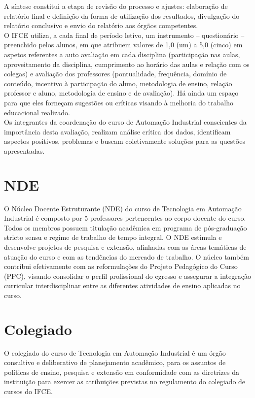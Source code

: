 A síntese constitui a etapa de revisão do processo e ajustes: elaboração de relatório final e definição da forma de utilização dos resultados, divulgação do relatório conclusivo e envio do relatório aos órgãos competentes.\\

O IFCE utiliza, a cada final de período letivo, um instrumento – questionário – preenchido pelos alunos, em que atribuem valores de 1,0 (um) a 5,0 (cinco) em aspetos referentes a auto avaliação em cada disciplina (participação nas aulas, aproveitamento da disciplina, cumprimento ao horário das aulas e relação com os colegas) e avaliação dos professores (pontualidade, frequência, domínio de conteúdo, incentivo à participação do aluno, metodologia de ensino, relação professor e aluno, metodologia de ensino e de avaliação). Há ainda um espaço para que eles forneçam sugestões ou críticas visando à melhoria do trabalho educacional realizado.\\

Os integrantes da coordenação do curso de Automação Industrial conscientes da importância desta avaliação, realizam análise crítica dos dados, identificam aspectos positivos, problemas e buscam coletivamente soluções para as questões apresentadas.\\

\section{NDE}
O Núcleo Docente Estruturante (NDE) do curso de Tecnologia em Automação Industrial é composto por 5 professores pertencentes ao corpo docente do curso. Todos os membros possuem titulação acadêmica em programa de pós-graduação stricto sensu e regime de trabalho de tempo integral. O NDE estimula e desenvolve projetos de pesquisa e extensão, alinhadas com as áreas temáticas de atuação do curso e com as tendências do mercado de trabalho. O núcleo também contribui efetivamente com as reformulações do Projeto Pedagógico do Curso (PPC), visando consolidar o perfil profissional do egresso e assegurar a integração curricular interdisciplinar entre as diferentes atividades de ensino aplicadas no curso.\\

\section{Colegiado}
O colegiado do curso de Tecnologia em Automação Industrial é um órgão consultivo e deliberativo de planejamento acadêmico, para os assuntos de políticas de ensino, pesquisa e extensão em conformidade com as diretrizes da instituição para exercer as atribuições previstas no regulamento do colegiado de cursos do IFCE.\\

